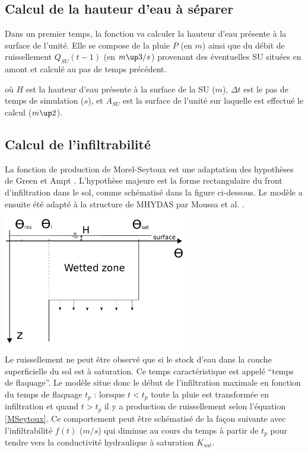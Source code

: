 \subsection{Calcul de la hauteur d'eau à séparer}
Dans un premier temps, la fonction va calculer la hauteur d'eau présente à la surface de l'unité. Elle se compose de la pluie $P$ (en $m$) ainsi que du débit de ruissellement $Q_{SU}(t-1)$ (en $m\up3/s$) provenant des éventuelles SU situées en amont et calculé au pas de temps précédent.



où $H$ est la hauteur d'eau présente à la surface de la SU ($m$), $\Delta t$ est le pas de temps de simulation ($s$), et $A_{SU}$ est la surface de l'unité sur laquelle est effectué le calcul ($m\up2$).


\subsection{Calcul de l'infiltrabilité}
La fonction de production de Morel-Seytoux \cite{MorelS1978} est une adaptation des hypothèses de Green et Ampt \cite{Green1911}. L'hypothèse majeure est la forme rectangulaire du front d'infiltration dans le sol, comme schématisé dans la figure ci-dessous. Le modèle a ensuite été adapté à la structure de MHYDAS par Moussa et al. \cite{Moussa2002}.\\

\includegraphics[width=8cm]{doc/common/Green_Ampt_humidity.pdf}\\

Le ruissellement ne peut être observé que si le stock d'eau dans la couche superficielle du sol est à saturation. Ce temps caractéristique est appelé ``temps de flaquage''. Le modèle situe donc le début de l’infiltration maximale en fonction du temps de flaquage $t_p$ : lorsque $t < t_p$ toute la pluie est transformée en infiltration et quand $t > t_p$ il y a production de ruissellement selon l'équation \ref{MSeytoux}. Ce comportement peut être schématisé de la façon suivante avec l'infiltrabilité $f(t)$ ($m/s$) qui diminue au cours du temps à partir de $t_p$ pour tendre vers la conductivité hydraulique à saturation $K_{sat}$.\\

